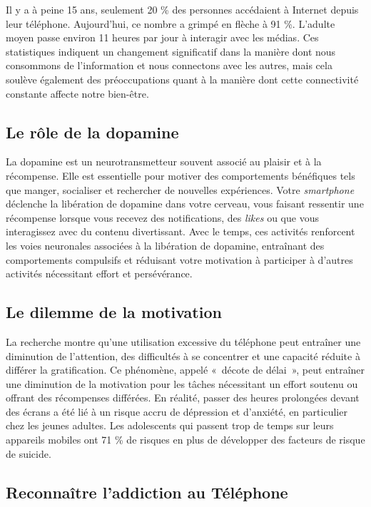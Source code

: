 \documentclass[a4paper, 12pt, garamond]{book}
\begin{document}
Il y a à peine 15 ans, seulement 20 \% des personnes accédaient à Internet
depuis leur téléphone. Aujourd'hui, ce nombre a grimpé en flèche à 91 \%.
L'adulte moyen passe environ 11 heures par jour à interagir avec les médias. Ces
statistiques indiquent un changement significatif dans la manière dont nous
consommons de l'information et nous connectons avec les autres, mais cela
soulève également des préoccupations quant à la manière dont cette connectivité
constante affecte notre bien-être.

\subsection{Le rôle de la dopamine}

La dopamine est un neurotransmetteur souvent associé au plaisir et à la
récompense. Elle est essentielle pour motiver des comportements bénéfiques tels
que manger, socialiser et rechercher de nouvelles expériences. Votre
\textit{smartphone} déclenche la libération de dopamine dans votre cerveau, vous
faisant ressentir une récompense lorsque vous recevez des notifications, des
\textit{likes} ou que vous interagissez avec du contenu divertissant. Avec le
temps, ces activités renforcent les voies neuronales associées à la libération
de dopamine, entraînant des comportements compulsifs et réduisant votre
motivation à participer à d'autres activités nécessitant effort et persévérance.

\subsection{Le dilemme de la motivation}

La recherche montre qu'une utilisation excessive du téléphone peut entraîner une
diminution de l'attention, des difficultés à se concentrer et une capacité
réduite à différer la gratification. Ce phénomène, appelé «~décote de délai~»,
peut entraîner une diminution de la motivation pour les tâches nécessitant un
effort soutenu ou offrant des récompenses différées. En réalité, passer des
heures prolongées devant des écrans a été lié à un risque accru de dépression et
d'anxiété, en particulier chez les jeunes adultes. Les adolescents qui passent
trop de temps sur leurs appareils mobiles ont 71 \% de risques en plus de
développer des facteurs de risque de suicide.

\subsection{Reconnaître l'addiction au Téléphone}
\end{document}
